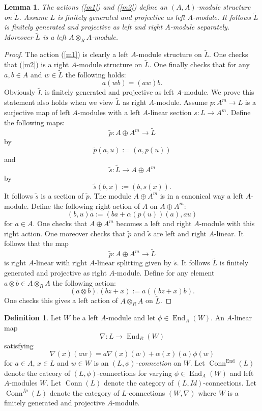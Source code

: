 \documentclass{amsart}
\theoremstyle{plain}
\newtheorem{lemma}[theorem]{Lemma}
\theoremstyle{definition}
\newtheorem{definition}[theorem]{Definition}
\theoremstyle{remark}
\numberwithin{equation}{theorem}
\begin{document}
\begin{lemma} \label{leftright} The actions (\ref{m1}) and (\ref{m2}) define an $({A},{A})$-module structure on ${\tilde{L} }$.
Assume $L$ is finitely generated and projective as left ${A}$-module. It follows ${\tilde{L} }$ is finitely generated
and projective as left and right ${A}$-module separately. Moreover ${\tilde{L} }$ is a left ${A}\otimes_{R}{A}$-module.
\end{lemma}
\begin{proof} The action (\ref{m1}) is clearly a left ${A}$-module structure on ${\tilde{L} }$. One checks that (\ref{m2}) is a
right ${A}$-module structure on ${\tilde{L} }$. One finally checks that for any $a,b \in {A}$ and $w\in {\tilde{L} }$ the following holds:
\[ a(wb)=(aw)b .\]
Obviously ${\tilde{L} }$ is finitely generated and projective as left ${A}$-module. We prove this statement also holds
when we view ${\tilde{L} }$ as right ${A}$-module. Assume $p:{A}^m\rightarrow L$ is a surjective map of left ${A}$-modules with a
left ${A}$-linear section $s:L\rightarrow {A}^m$. Define the following maps:
\[ {\tilde{p}}:{A}\oplus {A}^m\rightarrow {\tilde{L} } \]
by
\[ {\tilde{p}}(a,u):=(a,p(u)) \]
and
\[ {\tilde{s} }:{\tilde{L} }\rightarrow {A}\oplus {A}^m \]
by
\[ {\tilde{s} }(b,x):=(b,s(x)).\]
It follows ${\tilde{s} }$ is a section of ${\tilde{p}}$. The module ${A}\oplus {A}^m$ is in a canonical way a left ${A}$-module.
Define the following right action of ${A}$ on ${A}\oplus {A}^m$:
\[ (b,u)a:=(ba+\alpha(p(u))(a), au)\]
for $a\in {A}$. One checks that ${A}\oplus {A}^m$ becomes a left and right ${A}$-module with this right action.
One moreover checks that ${\tilde{p}}$ and ${\tilde{s} }$ are left and right ${A}$-linear. It follows that the map
\[ {\tilde{p}}:{A}\oplus {A}^m \rightarrow {\tilde{L} } \]
is right ${A}$-linear with right ${A}$-linear splitting given by ${\tilde{s} }$. It follows ${\tilde{L} }$ is finitely generated and
projective as right ${A}$-module.
Define for any element  $a\otimes b\in {A}\otimes_{R} {A}$ the following action:
\[ (a\otimes b).(bz+x):=a((bz+x)b).\]
One checks this gives a left action of ${A}\otimes_{R} {A}$ on ${\tilde{L} }$.
\end{proof}

\begin{definition} Let $W$ be a left ${A}$-module and let $\phi\in {\operatorname{End} }_{A}(W)$. An ${A}$-linear map
\[ \nabla:L\rightarrow {\operatorname{End} }_{R}(W) \]
satisfying 
\[ \nabla(x)(aw)=a\nabla(x)(w)+\alpha(x)(a)\phi(w) \]
for $a\in {A}$, $x\in L$ and $w\in W$ is an \emph{$(L,\phi )$-connection} on $W$. Let ${\operatorname{Conn}}^{\operatorname{End} }(L)$ denote 
the cateory of $(L,\phi)$-connections for varying $\phi \in {\operatorname{End} }_{A}(W)$ and left ${A}$-modules $W$.
Let ${\operatorname{Conn}}(L)$ denote the category of $(L, Id)$-connections. Let ${\operatorname{Conn}}^{fp}(L)$ denote the category
of $L$-connections $(W,\nabla)$ where $W$ is a finitely generated and projective ${A}$-module.
\end{definition}
\end{document}
